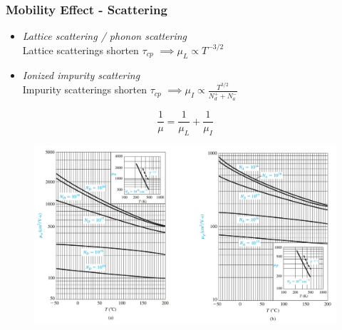 \documentclass{beamer}
\begin{document}
    \begin{frame} \frametitle{Mobility Effect - Scattering}
        \begin{itemize}
            \item \textit{Lattice scattering / phonon scattering} \\
                Lattice scatterings shorten $\tau_{cp}$ $\implies \mu_L \propto T^{-3/2}$
            \item \textit{Ionized impurity scattering} \\
                Impurity scatterings shorten $\tau_{cp}$ $\implies \mu_I \propto \frac{T^{3/2}}{N_d^+ + N_a^-} $
        \end{itemize}

        \begin{equation*}
            \frac{1}{\mu} = \frac{1}{\mu_L} + \frac{1}{\mu_I} 
        \end{equation*}

        \begin{figure}[H]
            \centering
            \includegraphics[width=0.7\linewidth]{Mobility-effect.jpg}
            \label{fig:Mobility-effect.jpg}
        \end{figure}
    \end{frame}
\end{document}
